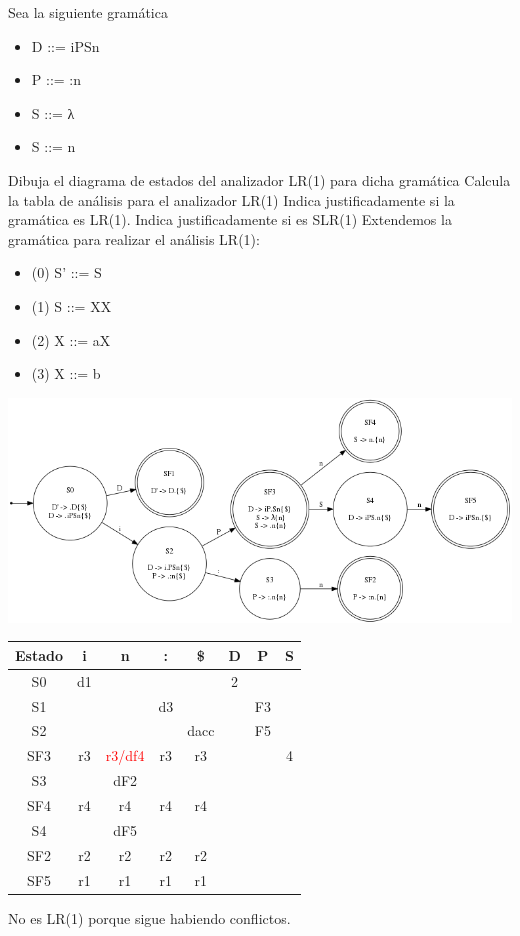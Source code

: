 \documentclass[nochap]{apuntes}
\begin{document}
\begin{problem}
Sea la siguiente gramática

\begin{itemize}
\item D ::= iPSn
\item P ::= :n
\item S ::= λ
\item S ::= n
\end{itemize}

\ppart Dibuja el diagrama de estados del analizador LR(1) para dicha gramática
\ppart Calcula la tabla de análisis para el analizador LR(1)
\ppart Indica justificadamente si la gramática es LR(1). Indica justificadamente si es SLR(1)
\solution
\ppart Extendemos la gramática para realizar el análisis LR(1):

\begin{itemize}
\item (0) S' ::= S
\item (1) S ::= XX
\item (2) X ::= aX
\item (3) X ::= b
\end{itemize}
\begin{center}
\includegraphics[scale=0.65]{automata10.png}
\end{center}

\ppart
\begin{tabular}{| c | c | c | c | c | c | c | c | }
\hline
Estado & i & n & : & \$ & D & P & S\\
\hline
S0 & d1 & &  &  & 2 &  & \\
\hline
S1 &  &  & d3 &  &  & F3 & \\
\hline
S2 &  &  &  & dacc &  & F5 &\\
\hline
SF3 & r3 & \textcolor{red}{r3/df4} & r3 & r3 &  &  & 4\\
\hline
S3 &  & dF2 & &  &  &  & \\
\hline
SF4 & r4  & r4  & r4 & r4 & &  &\\
\hline
S4 &  & dF5 &  &  &  &  & \\
\hline
SF2 & r2 & r2 & r2 & r2 &  &  & \\
\hline
SF5 & r1 & r1 & r1 & r1 &  &  & \\
\hline
\end{tabular}


\ppart
No es LR(1) porque sigue habiendo conflictos.
\end{problem}
\end{document}
